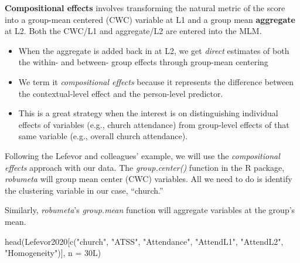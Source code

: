 \documentclass[
  english,
]{book}
\newenvironment{Shaded}{\begin{snugshade}}{\end{snugshade}}
\newcommand{\AttributeTok}[1]{\textcolor[rgb]{0.77,0.63,0.00}{#1}}
\newcommand{\CommentTok}[1]{\textcolor[rgb]{0.56,0.35,0.01}{\textit{#1}}}
\newcommand{\FunctionTok}[1]{\textcolor[rgb]{0.00,0.00,0.00}{#1}}
\newcommand{\NormalTok}[1]{#1}
\newcommand{\OtherTok}[1]{\textcolor[rgb]{0.56,0.35,0.01}{#1}}
\newcommand{\SpecialCharTok}[1]{\textcolor[rgb]{0.00,0.00,0.00}{#1}}
\newcommand{\StringTok}[1]{\textcolor[rgb]{0.31,0.60,0.02}{#1}}
\providecommand{\tightlist}{%
  \setlength{\itemsep}{0pt}\setlength{\parskip}{0pt}}
\begin{document}
\textbf{Compositional effects} \citep{enders_centering_2007} involves transforming the natural metric of the score into a group-mean centered (CWC) variable at L1 and a group mean \textbf{aggregate} at L2. Both the CWC/L1 and aggregate/L2 are entered into the MLM.

\begin{itemize}
\tightlist
\item
  When the aggregate is added back in at L2, we get \emph{direct} estimates of both the within- and between- group effects through group-mean centering
\item
  We term it \emph{compositional effects} because it represents the difference between the contextual-level effect and the person-level predictor.
\item
  This is a great strategy when the interest is on distinguishing individual effects of variables (e.g., church attendance) from group-level effects of that same variable (e.g., overall church attendance).
\end{itemize}

Following the Lefevor and colleagues' \citeyearpar{lefevor_homonegativity_2020} example, we will use the \emph{compositional effects} approach with our data. The \emph{group.center()} function in the R package, \emph{robumeta} will group mean center (CWC) variables. All we need to do is identify the clustering variable in our case, ``church.''

Similarly, \emph{robumeta}'s \emph{group.mean} function will aggregate variables at the group's mean.

\begin{Shaded}
\end{Shaded}

\begin{Shaded}
\begin{Highlighting}[]
\FunctionTok{head}\NormalTok{(Lefevor2020[}\FunctionTok{c}\NormalTok{(}\StringTok{"church"}\NormalTok{, }\StringTok{"ATSS"}\NormalTok{, }\StringTok{"Attendance"}\NormalTok{, }\StringTok{"AttendL1"}\NormalTok{, }\StringTok{"AttendL2"}\NormalTok{, }\StringTok{"Homogeneity"}\NormalTok{)], }\AttributeTok{n =}\NormalTok{ 30L)}
\end{Highlighting}
\end{Shaded}
\end{document}
